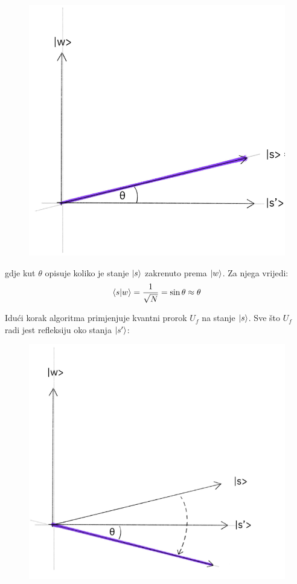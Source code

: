 \begin{figure}[H]
\centering
\includegraphics[scale=0.4]{img/grover1.png}
\end{figure}
gdje kut $\theta$ opisuje koliko je stanje $\ket{s}$ zakrenuto prema $\ket{w}$. Za njega vrijedi:
\begin{equation}
\braket{s|w} = \frac{1}{\sqrt{N}} = \sin\theta \approx \theta
\end{equation}

Idući korak algoritma primjenjuje kvantni prorok $U_f$ na stanje $\ket{s}$. Sve što $U_f$ radi jest refleksiju oko stanja $\ket{s'}$:

\begin{figure}[H]
\centering
\includegraphics[scale=0.4]{img/grover2.png}
\end{figure}

